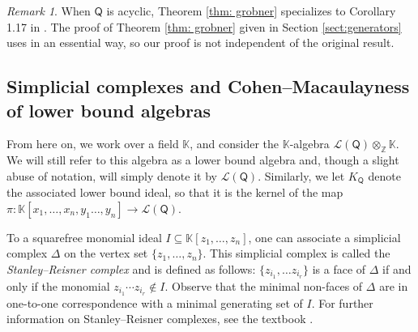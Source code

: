 \documentclass[10pt]{amsart}
\numberwithin{equation}{section}
\theoremstyle{definition}
\theoremstyle{remark}
\newtheorem{rem}[thm]{Remark}
\newcommand{\1}{^{-1}}
\def\Q{\mathsf{Q}}
\begin{document}
\begin{rem}
When $\Q$ is acyclic, Theorem \ref{thm: grobner} specializes to Corollary 1.17 in \cite{BFZ05}.  The proof of Theorem \ref{thm: grobner} given in Section \ref{sect:generators} uses \cite[Corollary 1.17]{BFZ05} in an essential way, so our proof is not independent of the original result.
%
\end{rem}


\subsection{Simplicial complexes and Cohen--Macaulayness of lower bound algebras}
From here on, we work over a field $\mathbb{K}$, and consider the $\mathbb{K}$-algebra $\mathcal{L}(\Q)\otimes_\mathbb{Z}\mathbb{K}$. We will still refer to this algebra as a lower bound algebra and, though a slight abuse of notation, will simply denote it by $\mathcal{L}(\Q)$. Similarly, we let $K_\Q$ denote the associated lower bound ideal, so that it is the kernel of the map $\pi:\mathbb{K}[x_1,\dots,x_n,y_1\dots,y_n]\rightarrow \mathcal{L}(\Q)$.

To a squarefree monomial ideal $I\subseteq \mathbb{K}[z_1,\dots,z_n]$, one can associate a simplicial complex $\Delta$ on the vertex set $\{z_1,\dots,z_n\}$. This simplicial complex is called the \textit{Stanley--Reisner complex} and is defined as follows: $\{z_{i_1},\dots z_{i_r}\}$ is a face of $\Delta$ if and only if the monomial $z_{i_1}\cdots z_{i_r}\notin I$. Observe that the minimal non-faces of $\Delta$ are in one-to-one correspondence with a minimal generating set of $I$. For further information on Stanley--Reisner complexes, see the textbook \cite[Chapter 1]{MillerSturmfels}.
\end{document}
